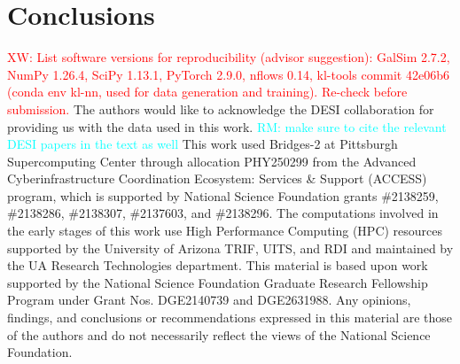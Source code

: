 \documentclass[reprint,superscriptaddress,showframe,nofootinbib,aps,prd,longbibliography,noeprint]{revtex4-2}
\newcommand{\XW}[1]{{\textcolor{red}{XW: #1}}}
\newcommand{\rachel}[1]{{\textcolor{cyan}{RM: #1}}}
\begin{document}







\section{Conclusions}
\label{sec:conclusion}
\lipsum[1][1]

\begin{acknowledgments}
\XW{List software versions for reproducibility (advisor suggestion): GalSim 2.7.2, NumPy 1.26.4, SciPy 1.13.1, PyTorch 2.9.0, nflows 0.14, kl-tools commit 42e06b6 (conda env kl-nn, used for data generation and training). Re-check before submission.}
The authors would like to acknowledge the DESI collaboration for providing us with the data used in this work. \rachel{make sure to cite the relevant DESI papers in the text as well} This work used Bridges-2 \citep{Bridges2} at Pittsburgh Supercomputing Center through allocation PHY250299 from the Advanced Cyberinfrastructure Coordination Ecosystem: Services \& Support (ACCESS) program, which is supported by National Science Foundation grants \#2138259, \#2138286, \#2138307, \#2137603, and \#2138296. The computations involved in the early stages of this work use High Performance Computing (HPC) resources supported by the University of Arizona TRIF, UITS, and RDI and maintained by the UA Research Technologies department. This material is based upon work supported by the National Science Foundation Graduate Research Fellowship Program under Grant Nos. DGE2140739 and DGE2631988. Any opinions, findings, and conclusions or recommendations expressed in this material are those of the authors and do not necessarily reflect the views of the National Science Foundation.
\end{acknowledgments} 

%
\end{document}
